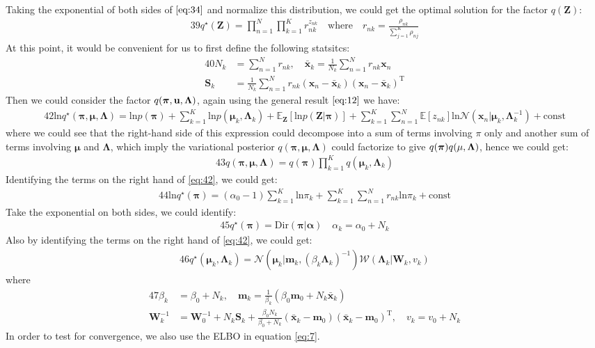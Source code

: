 \documentclass[letterpaper]{article}
\newcommand{\bx}{\mathbf{x}}
\newcommand{\bmu}{\boldsymbol{\mu}}
\newcommand{\calN}{\mathcal{N}}
\newcommand{\bT}{\mathrm{T}}
\newcommand{\bm}{\mathbf{m}}
\newcommand{\bZ}{\mathbf{Z}}
\newcommand{\bpi}{\boldsymbol{\pi}}
\newcommand{\bLambda}{\boldsymbol{\Lambda}}
\newcommand{\calW}{\mathcal{W}}
\newcommand{\balpha}{\boldsymbol{\alpha}}
\newcommand{\prodn}{\prod_{n=1}^N}
\newcommand{\prodk}{\prod_{k=1}^K}
\newcommand{\sumn}{\sum_{n=1}^N}
\newcommand{\sumk}{\sum_{k=1}^K}
\newcommand{\bW}{\mathbf{W}}
\newcommand{\bS}{\mathbf{S}}
\begin{document}
Taking the exponential of both sides of $\eqref{eq:34}$ and normalize this distribution, we could get the optimal solution for the factor $q(\bZ)$:
\begin{alignat}{39}\label{eq:39}
q^{\star}(\bZ) = \prodn \prodk r_{nk}^{z_{nk}} \quad \text{where} \quad r_{nk} = \frac{\rho_{nk}}{\sum_{j=1}^K \rho_{nj}}
\end{alignat}
At this point, it would be convenient for us to first define the following statsitcs:
\begin{alignat}{40}
N_k &= \sumn r_{nk}, \quad \bar{\bx}_k = \frac{1}{N_k} \sumn r_{nk} \bx_n \label{eq:40}\\
\bS_k &= \frac{1}{N_k} \sumn r_{nk} (\bx_n - \bar{\bx}_k)(\bx_n - \bar{\bx}_k)^{\bT} \label{eq:41}
\end{alignat}
Then we could consider the factor $q(\bpi, \bf{u}, \bLambda)$, again using the general result $\eqref{eq:12}$ we have:
\begin{alignat}{42}\label{eq:42}
\mathrm{ln} q^{\star}(\bpi, \bmu, \bLambda) = \mathrm{ln} p(\bpi) + \sumk \mathrm{ln} p(\bmu_k, \bLambda_k) + \mathbb{E}_{\bZ} [\mathrm{ln} p(\bZ | \bpi)] + \sumk \sumn \mathbb{E}[z_{nk}] \mathrm{ln} \calN (\bx_n | \bmu_k, \bLambda_k^{-1}) + \mathrm{const}
\end{alignat}
where we could see that the right-hand side of this expression could decompose into a sum of terms involving $\pi$ only and another sum of terms involving $\bmu$ and $\bLambda$, which imply the variational posterior $q(\bpi, \bmu, \bLambda)$ could factorize to give $q(\bpi)q(\bf{\mu},\bLambda)$, hence we could get:
\begin{alignat}{43}\label{eq:43}
q(\bpi, \bmu, \bLambda) = q(\bpi) \prodk q(\bmu_k, \bLambda_k)
\end{alignat}
Identifying the terms on the right hand of \eqref{eq:42}, we could get:
\begin{alignat}{44}\label{eq:44}
\mathrm{ln} q^{\star}(\bpi) = (\alpha_0 - 1) \sumk \mathrm{ln} \pi_k + \sumk \sumn r_{nk} \mathrm{ln} \pi_k + \mathrm{const}
\end{alignat}
Take the exponential on both sides, we could identify:
\begin{alignat}{45}\label{eq:45}
q^{\star}(\bpi) = \mathrm{Dir}(\bpi | \balpha) \quad \alpha_k = \alpha_0 + N_k
\end{alignat}
Also by identifying the terms on the right hand of \eqref{eq:42}, we could get:
\begin{alignat}{46}\label{eq:46}
q^{\star}(\bmu_k, \bLambda_k) = \calN(\bmu_k | \bm_k, (\beta_k \bLambda_k)^{-1}) \calW(\bLambda_k | \bW_k, v_k)
\end{alignat}
where 
\begin{alignat}{47}
\beta_k &= \beta_0 + N_k, \quad \bm_k = \frac{1}{\beta_k} (\beta_0 \bm_0 + N_k \bar{\bx}_k) \label{eq:47}\\
\bW_k^{-1} &= \bW_0^{-1} + N_k \bS_k + \frac{\beta_0 N_k}{\beta_0 + N_k} (\bar{\bx}_k - \bm_0)(\bar{\bx}_k - \bm_0)^{\bT}, \quad v_k = v_0 + N_k \label{eq:48}
\end{alignat}
In order to test for convergence, we also use the ELBO in equation \eqref{eq:7}.
\end{document}
